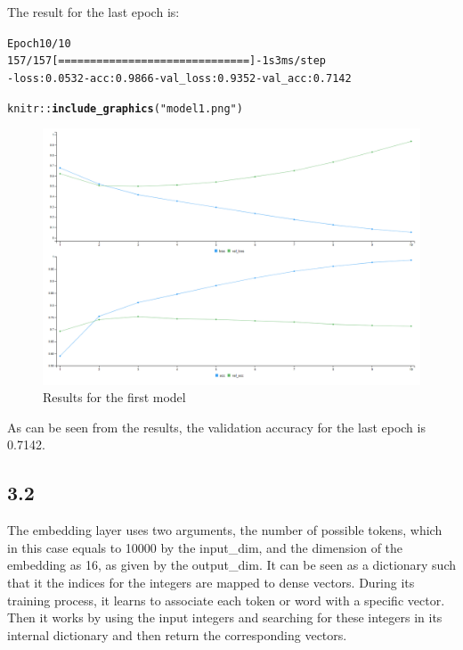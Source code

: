 \documentclass[10pt, a4paper, english]{article}\usepackage[]{graphicx}\usepackage[dvipsnames]{xcolor}
\makeatletter
\def\maxwidth{ %
  \ifdim\Gin@nat@width>\linewidth
    \linewidth
  \else
    \Gin@nat@width
  \fi
}
\newcommand{\hlstr}[1]{\textcolor[rgb]{0.192,0.494,0.8}{#1}}%
\newcommand{\hlopt}[1]{\textcolor[rgb]{0,0,0}{#1}}%
\newcommand{\hlstd}[1]{\textcolor[rgb]{0.345,0.345,0.345}{#1}}%
\newcommand{\hlkwd}[1]{\textcolor[rgb]{0.737,0.353,0.396}{\textbf{#1}}}%
\newenvironment{kframe}{%
 \def\at@end@of@kframe{}%
 \ifinner\ifhmode%
  \def\at@end@of@kframe{\end{minipage}}%
  \begin{minipage}{\columnwidth}%
 \fi\fi%
 \def\FrameCommand##1{\hskip\@totalleftmargin \hskip-\fboxsep
 \colorbox{shadecolor}{##1}\hskip-\fboxsep
     \hskip-\linewidth \hskip-\@totalleftmargin \hskip\columnwidth}%
 \MakeFramed {\advance\hsize-\width
   \@totalleftmargin\z@ \linewidth\hsize
   \@setminipage}}%
 {\par\unskip\endMakeFramed%
 \at@end@of@kframe}
\newenvironment{knitrout}{}{} %
\makeatother
\begin{document}
The result for the last epoch is:
\begin{knitrout}
\color{fgcolor}\begin{kframe}
\begin{alltt}
Epoch 10/10
157/157 [==============================] - 1s 3ms/step 
- loss: 0.0532 - acc: 0.9866 - val_loss: 0.9352 - val_acc: 0.7142
\end{alltt}
\end{kframe}
\end{knitrout}

\begin{knitrout}
\color{fgcolor}\begin{kframe}
\begin{alltt}
\hlstd{knitr}\hlopt{::}\hlkwd{include_graphics}\hlstd{(}\hlstr{"model1.png"}\hlstd{)}
\end{alltt}
\end{kframe}\begin{figure}
\includegraphics[width=\maxwidth]{model1} \caption[Results for the first model]{Results for the first model}\label{fig:unnamed-chunk-15}
\end{figure}

\end{knitrout}

As can be seen from the results, the validation accuracy for the last epoch is 0.7142.
\subsection{3.2}
The embedding layer uses two arguments, the number of possible tokens, which in this case equals to 10000 by the input\_dim,  and the dimension of the embedding as 16, as given by the output\_dim.
It can be seen as a dictionary such that it the indices for the integers are mapped to dense vectors. During its training process, it learns to associate each token or word with a specific vector. Then 
it works by using the input integers and searching for these integers in its internal dictionary and then return the corresponding vectors. 
\end{document}
